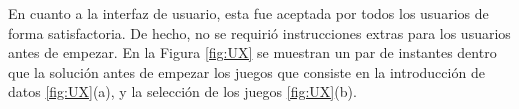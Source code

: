 \documentclass[conference]{IEEEtran}
\begin{document}
En cuanto a la interfaz de usuario, esta fue aceptada por todos los usuarios de forma satisfactoria. De hecho, no se requirió instrucciones extras para los usuarios antes de empezar. En la Figura \ref{fig:UX} se muestran un par de instantes dentro que la solución antes de empezar los juegos que consiste en la introducción de datos \ref{fig:UX}(a), y la selección de los juegos \ref{fig:UX}(b).

%
%



%
%
\end{document}
